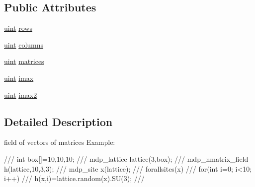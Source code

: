 \subsection*{Public Attributes}
\begin{DoxyCompactItemize}
\item 
\hyperlink{mdp__global__vars_8h_a91ad9478d81a7aaf2593e8d9c3d06a14}{uint} \hyperlink{classmdp__nmatrix__field_a6166f4d394efa361e3fa9552506c7c36}{rows}
\item 
\hyperlink{mdp__global__vars_8h_a91ad9478d81a7aaf2593e8d9c3d06a14}{uint} \hyperlink{classmdp__nmatrix__field_aaa3de1fa235579a53d5b4a3bc1ef504e}{columns}
\item 
\hyperlink{mdp__global__vars_8h_a91ad9478d81a7aaf2593e8d9c3d06a14}{uint} \hyperlink{classmdp__nmatrix__field_a7ace5d4385ddb2f67a8f1c5e65fbf22e}{matrices}
\item 
\hyperlink{mdp__global__vars_8h_a91ad9478d81a7aaf2593e8d9c3d06a14}{uint} \hyperlink{classmdp__nmatrix__field_a3f49b21188df1a14427384d3501b8926}{imax}
\item 
\hyperlink{mdp__global__vars_8h_a91ad9478d81a7aaf2593e8d9c3d06a14}{uint} \hyperlink{classmdp__nmatrix__field_acc8ab22ea97de1a94f6e3abe818cbafa}{imax2}
\end{DoxyCompactItemize}


\subsection{Detailed Description}
field of vectors of matrices Example: \begin{DoxyVerb}
///    int box[]={10,10,10};
///    mdp_lattice lattice(3,box);
///    mdp_nmatrix_field h(lattice,10,3,3);
///    mdp_site x(lattice);
///    forallsites(x)
///      for(int i=0; i<10; i++)
///        h(x,i)=lattice.random(x).SU(3);
/// \end{DoxyVerb}
 

